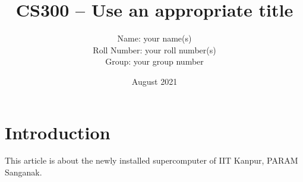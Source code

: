 \documentclass{article}
\title{CS300 -- Use an appropriate title}
\author{Name: your name(s) \\Roll Number: your roll number(s)\\Group: your group number\\}
\date{August 2021}
\begin{document}
\maketitle

\section{Introduction}
This article is about the newly installed supercomputer of IIT Kanpur, PARAM Sanganak.







\end{document}
